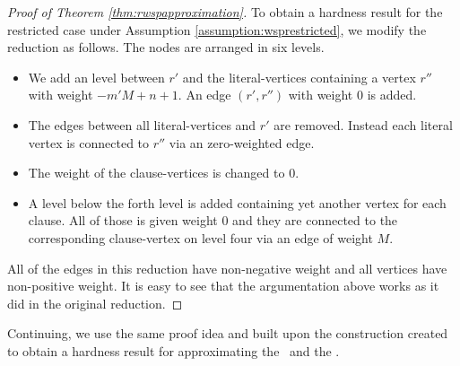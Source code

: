 \begin{proof}[Proof of Theorem \ref{thm:rwspapproximation}]
	To obtain a hardness result for the restricted case under Assumption \ref{assumption:wsprestricted}, we modify the reduction as follows. The nodes are arranged in six levels.
	\begin{itemize}
		\item We add an level between $r'$ and the literal-vertices containing a vertex $r''$ with weight $-m'M+n+1$. An edge $(r', r'')$ with weight $0$ is added.
		\item The edges between all literal-vertices and $r'$ are removed. Instead each literal vertex is connected to $r''$ via an zero-weighted edge.
		\item The weight of the clause-vertices is changed to $0$.
		\item A level below the forth level is added containing yet another vertex for each clause. All of those is given weight $0$ and they are connected to the corresponding clause-vertex on level four via an edge of weight $M$.
	\end{itemize}
	All of the edges in this reduction have non-negative weight and all vertices have non-positive weight. It is easy to see that the argumentation above works as it did in the original	reduction.
\end{proof}

Continuing, we use the same proof idea and built upon the construction created to obtain a hardness result for approximating the \WSP\ and the \WISP.

